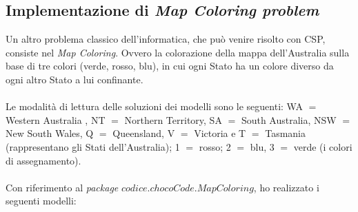 \subsection{Implementazione di \textit{Map Coloring problem}}
Un altro problema classico dell'informatica, che pu\`o venire risolto con CSP, consiste nel \textit{Map Coloring}. Ovvero la colorazione della mappa dell'Australia sulla base di tre colori (verde, rosso, blu), in cui ogni Stato ha un colore diverso da ogni altro Stato a lui confinante.\\\\
\noindent
Le modalit\`a di lettura delle soluzioni dei modelli sono le seguenti: WA $=$ Western Australia , NT $=$ Northern Territory, SA $=$ South Australia, NSW $=$ New South Wales, Q $=$ Queensland, V $=$ Victoria e T $=$ Tasmania (rappresentano gli Stati dell'Australia);  1 $=$ rosso; 2 $=$ blu, 3 $=$ verde (i colori di assegnamento).\\\\
\noindent
Con riferimento al \textit{package} $codice.chocoCode.MapColoring$, ho realizzato i seguenti modelli:
